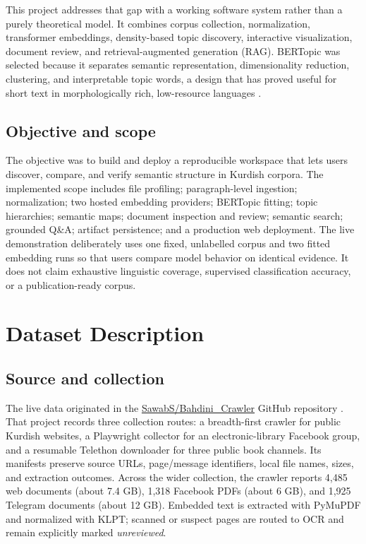 \documentclass[11pt,a4paper]{article}
\newcommand{\githubicon}{\textcolor{Navy}{\faGithub}\hspace{0.35em}}
\begin{document}
This project addresses that gap with a working software system rather than a
purely theoretical model. It combines corpus collection, normalization,
transformer embeddings, density-based topic discovery, interactive
visualization, document review, and retrieval-augmented generation (RAG).
BERTopic was selected because it separates semantic representation,
dimensionality reduction, clustering, and interpretable topic words, a design
that has proved useful for short text in morphologically rich, low-resource
languages \parencite{grootendorst2022,medvecki2024}.

\subsection{Objective and scope}

The objective was to build and deploy a reproducible workspace that lets users
discover, compare, and verify semantic structure in Kurdish corpora. The
implemented scope includes file profiling; paragraph-level ingestion;
normalization; two hosted embedding providers; BERTopic fitting; topic
hierarchies; semantic maps; document inspection and review; semantic search;
grounded Q\&A; artifact persistence; and a production web deployment. The live
demonstration deliberately uses one fixed, unlabelled corpus and two fitted
embedding runs so that users compare model behavior on identical evidence. It
does not claim exhaustive linguistic coverage, supervised classification
accuracy, or a publication-ready corpus.

\section{Dataset Description}

\subsection{Source and collection}

The live data originated in the
\githubicon\href{https://github.com/SawabS/Bahdini_Crawler}{SawabS/Bahdini\_Crawler}
GitHub repository \parencite{sawabs2026crawler}. That project records three collection routes:
a breadth-first crawler for public Kurdish websites, a Playwright collector for
an electronic-library Facebook group, and a resumable Telethon downloader for
three public book channels. Its manifests preserve source URLs, page/message
identifiers, local file names, sizes, and extraction outcomes. Across the wider
collection, the crawler reports 4,485 web documents (about 7.4 GB), 1,318
Facebook PDFs (about 6 GB), and 1,925 Telegram documents (about 12 GB).
Embedded text is extracted with PyMuPDF and normalized with KLPT; scanned or
suspect pages are routed to OCR and remain explicitly marked
\emph{unreviewed}.
\end{document}
